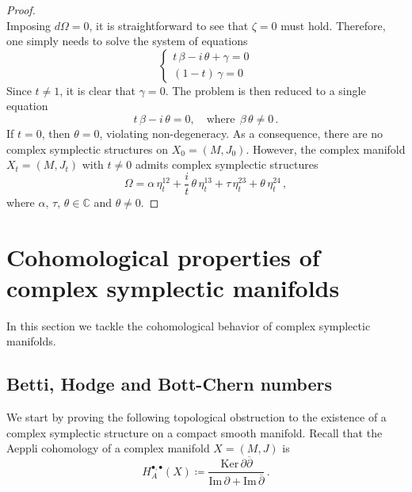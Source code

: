 \documentclass[a4paper]{amsart}
\theoremstyle{definition}
\theoremstyle{remark}
\numberwithin{equation}{section}
\begin{document}
\begin{proof}
\[\]
Imposing $d\Omega=0$, it is straightforward to see that $\zeta=0$ must hold. Therefore, one simply needs to solve the system of equations
\[
\begin{cases}
t\,\beta-i\,\theta+\gamma=0\\
(1-t)\,\gamma=0
\end{cases}
\]
Since $t\neq 1$, it is clear that $\gamma=0$. The problem is then reduced to a single equation
\[
t\,\beta-i\,\theta=0,\quad \text{where}\ \ \beta\,\theta\neq 0\,.
\]
If $t=0$, then $\theta=0$, violating non-degeneracy. As a consequence, there are no complex symplectic structures on $X_{0}=(M,J_{0})$. However, the complex manifold $X_{t}=(M,J_{t})$ with $t\neq 0$  admits complex symplectic structures
\[
\Omega=\alpha\,\eta_t^{12}+\frac it\,\theta\,\eta_t^{13}+\tau\,\eta_t^{23}+\theta\,\eta_t^{24}\,,
\]
where $\alpha,\,\tau,\,\theta\in\mathbb C$ and $\theta\neq 0$.
\end{proof}


\section{Cohomological properties of complex symplectic manifolds}\label{cohomology}

In this section we tackle the cohomological behavior of complex symplectic manifolds.

\subsection{Betti, Hodge and Bott-Chern numbers}

We start by proving the following topological obstruction to the existence of a complex symplectic structure on a compact smooth manifold. Recall that the Aeppli cohomology of a complex manifold $X=(M,J)$ is
\[
H^{\bullet,\bullet}_{A}(X)\coloneqq\frac{\text{Ker}\,\partial\overline\partial}{\text{Im}\,\partial+\text{Im}\,\overline\partial}\,.	
\]
\end{document}
